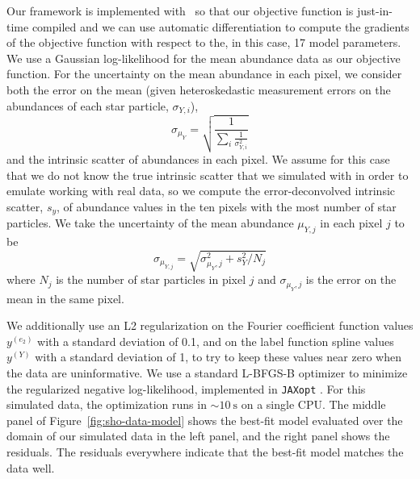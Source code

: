 Our framework is implemented with \jax\ so that our objective function is just-in-time
compiled and we can use automatic differentiation to compute the gradients of the
objective function with respect to the, in this case, 17 model parameters.
We use a Gaussian log-likelihood for the mean  abundance data as our
objective function.
For the uncertainty on the mean abundance in each pixel, we consider both the error on
the mean (given heteroskedastic measurement errors on the abundances of each star
particle, $\sigma_{Y,i}$),
\begin{equation}
    \sigma_{\mu_Y} = \sqrt{\frac{1}{\sum_i \frac{1}{\sigma^2_{Y,i}}}}
\end{equation}
and the intrinsic scatter of abundances in each pixel.
We assume for this case that we do not know the true intrinsic scatter that we simulated
with in order to emulate working with real data, so we compute the error-deconvolved
intrinsic scatter, $s_y$, of abundance values in the ten pixels with the most number of
star particles.
We take the uncertainty of the mean abundance $\mu_{Y,j}$ in each pixel $j$ to be
\begin{equation}
    \sigma_{\mu_{Y,j}} = \sqrt{\sigma_{\mu_Y, j}^2 + s_Y^2 / N_j}
\end{equation}
where $N_j$ is the number of star particles in pixel $j$ and $\sigma_{\mu_Y, j}$ is the
error on the mean in the same pixel.

We additionally use an L2 regularization on the Fourier coefficient function values
$y^{(e_2)}$ with a standard deviation of 0.1, and on the label function spline values
$y^{(Y)}$ with a standard deviation of 1, to try to keep these values near zero when the
data are uninformative.
We use a standard L-BFGS-B optimizer \citep{Byrd:1995} to minimize the regularized
negative log-likelihood, implemented in \texttt{JAXopt} \cite{jaxopt:2021}.
For this simulated data, the optimization runs in $\sim 10~\unit{\second}$ on a single
CPU.
The middle panel of Figure~\ref{fig:sho-data-model} shows the best-fit model evaluated
over the domain of our simulated data in the left panel, and the right panel shows the
residuals.
The residuals everywhere indicate that the best-fit model matches the data well.


